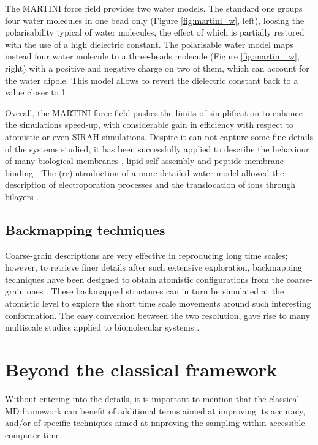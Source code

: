 The MARTINI force field provides two water models. The standard one groups four water molecules in one bead only (Figure \ref{fig:martini_w}, left), loosing the polarisability typical of water molecules, the effect of which is partially restored with the use of a high dielectric constant. The polarisable water model \citep{Yesylevskyy2010} maps instead four water molecule to a three-beads molecule (Figure \ref{fig:martini_w}, right) with a positive and negative charge on two of them, which can account for the water dipole. This model allows to revert the dielectric constant back to a value closer to 1.

Overall, the MARTINI force field pushes the limits of simplification to enhance the simulations speed-up, with considerable gain in efficiency with respect to atomistic or even SIRAH simulations. Despite it can not capture some fine details of the systems studied, it has been successfully applied to describe the behaviour of many biological membranes \citep{Khalid2019,Samsudin2017}, lipid self-assembly \citep{Marrink2007} and peptide-membrane binding \citep{Song2019}. The (re)introduction of a more detailed water model allowed the description of electroporation processes and the translocation of ions through bilayers \citep{Yesylevskyy2010}.

\subsection{Backmapping techniques} Coarse-grain descriptions are very effective in reproducing long time scales; however, to retrieve finer details after such extensive exploration, backmapping techniques have been designed to obtain atomistic configurations from the coarse-grain ones \citep{Wassenaar2015}. These backmapped structures can in turn be simulated at the atomistic level to explore the short time scale movements around such interesting conformation. The easy conversion between the two resolution, gave rise to many multiscale studies applied to biomolecular systems \citep{Lee2012}.


\section{Beyond the classical framework}

Without entering into the details, it is important to mention that the classical MD framework can benefit of additional terms aimed at improving its accuracy, and/or of specific techniques aimed at improving the
 sampling within accessible computer time.
 
